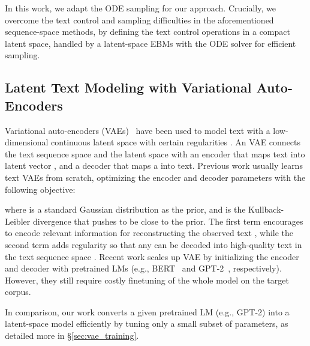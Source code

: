 \documentclass[11pt]{article}
\begin{document}
In this work, we adapt the ODE sampling for our approach. Crucially, we overcome the text control and sampling difficulties in the aforementioned sequence-space methods, by defining the text control operations in a compact latent space, handled by a latent-space EBMs with the ODE solver for efficient sampling.
























\subsection{Latent Text Modeling with Variational Auto-Encoders}
\label{sec:bg_vae}
Variational auto-encoders (VAEs)~\cite{DBLP:journals/corr/KingmaW13,DBLP:conf/icml/RezendeMW14} have been used to model text with a low-dimensional continuous latent space with certain regularities \citep{DBLP:conf/conll/BowmanVVDJB16,hu2017toward}. An VAE connects the text sequence space  and the latent space  with an encoder  that maps text  into latent vector , and a decoder  that maps a  into text. Previous work usually learns text VAEs from scratch, optimizing the encoder and decoder parameters with the following objective:

where  is a standard Gaussian distribution as the prior, and  is the Kullback-Leibler divergence that pushes  to be close to the prior. The first term encourages  to encode relevant information for reconstructing the observed text , while the second term adds regularity so that any  can be decoded into high-quality text in the text sequence space .
Recent work \citep{li-etal-2020-optimus,hu2021causal} scales up VAE by initializing the encoder and decoder with pretrained LMs (e.g., BERT~\cite{bert} and GPT-2~\cite{gpt2}, respectively). However, they still require costly finetuning of the whole model on the target corpus. 

In comparison, our work converts a given pretrained LM (e.g., GPT-2) into a latent-space model efficiently by tuning only a small subset of parameters, as detailed more in \S\ref{sec:vae_training}.
\end{document}
